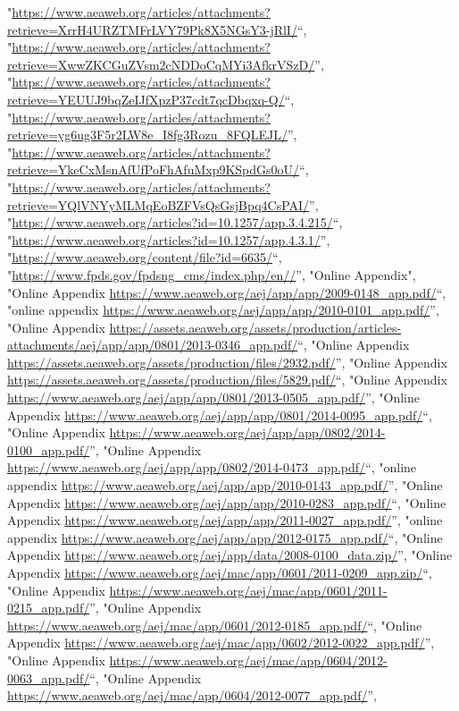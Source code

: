 \documentclass[]{article}
\begin{document}
\begin{itemize}
  "\url{https://www.aeaweb.org/articles/attachments?retrieve=XrrH4URZTMFrLVY79Pk8X5NGsY3-jRlI/}``,
  "\url{https://www.aeaweb.org/articles/attachments?retrieve=XwwZKCGuZVsm2cNDDoCqMYi3AfkrVSzD/}'',
  "\url{https://www.aeaweb.org/articles/attachments?retrieve=YEUUJ9bqZeIJfXpzP37cdt7qcDbqxq-Q/}``,
  "\url{https://www.aeaweb.org/articles/attachments?retrieve=yg6ug3F5r2LW8e_I8fg3Rozu_8FQLEJL/}'',
  "\url{https://www.aeaweb.org/articles/attachments?retrieve=YkeCxMsnAfUfPoFhAfuMxp9KSpdGs0oU/}``,
  "\url{https://www.aeaweb.org/articles/attachments?retrieve=YQlVNYyMLMqEoBZFVsQsGsjBpq4CsPAI/}'',
  "\url{https://www.aeaweb.org/articles?id=10.1257/app.3.4.215/}``,
  "\url{https://www.aeaweb.org/articles?id=10.1257/app.4.3.1/}'',
  "\url{https://www.aeaweb.org/content/file?id=6635/}``,
  "\url{https://www.fpds.gov/fpdsng_cms/index.php/en//}'', "Online
  Appendix", "Online Appendix
  \url{https://www.aeaweb.org/aej/app/app/2009-0148_app.pdf/}``, "online
  appendix
  \url{https://www.aeaweb.org/aej/app/app/2010-0101_app.pdf/}'', "Online
  Appendix
  \url{https://assets.aeaweb.org/assets/production/articles-attachments/aej/app/app/0801/2013-0346_app.pdf/}``,
  "Online Appendix
  \url{https://assets.aeaweb.org/assets/production/files/2932.pdf/}'',
  "Online Appendix
  \url{https://assets.aeaweb.org/assets/production/files/5829.pdf/}``,
  "Online Appendix
  \url{https://www.aeaweb.org/aej/app/app/0801/2013-0505_app.pdf/}'',
  "Online Appendix
  \url{https://www.aeaweb.org/aej/app/app/0801/2014-0095_app.pdf/}``,
  "Online Appendix
  \url{https://www.aeaweb.org/aej/app/app/0802/2014-0100_app.pdf/}'',
  "Online Appendix
  \url{https://www.aeaweb.org/aej/app/app/0802/2014-0473_app.pdf/}``,
  "online appendix
  \url{https://www.aeaweb.org/aej/app/app/2010-0143_app.pdf/}'', "Online
  Appendix
  \url{https://www.aeaweb.org/aej/app/app/2010-0283_app.pdf/}``, "Online
  Appendix
  \url{https://www.aeaweb.org/aej/app/app/2011-0027_app.pdf/}'', "online
  appendix
  \url{https://www.aeaweb.org/aej/app/app/2012-0175_app.pdf/}``, "Online
  Appendix
  \url{https://www.aeaweb.org/aej/app/data/2008-0100_data.zip/}'',
  "Online Appendix
  \url{https://www.aeaweb.org/aej/mac/app/0601/2011-0209_app.zip/}``,
  "Online Appendix
  \url{https://www.aeaweb.org/aej/mac/app/0601/2011-0215_app.pdf/}'',
  "Online Appendix
  \url{https://www.aeaweb.org/aej/mac/app/0601/2012-0185_app.pdf/}``,
  "Online Appendix
  \url{https://www.aeaweb.org/aej/mac/app/0602/2012-0022_app.pdf/}'',
  "Online Appendix
  \url{https://www.aeaweb.org/aej/mac/app/0604/2012-0063_app.pdf/}``,
  "Online Appendix
  \url{https://www.aeaweb.org/aej/mac/app/0604/2012-0077_app.pdf/}'',

\end{itemize}
\end{document}
